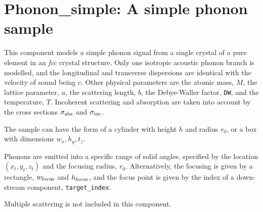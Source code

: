 \section{Phonon\_simple: A simple phonon sample}
\label{s:phonon_simple}


This component models a simple phonon signal from a single crystal of
a pure element in an {\em fcc} crystal structure.
Only one isotropic acoustic phonon branch is modelled, and the longitudinal
and transverse dispersions are identical with the velocity of sound being $c$.
Other physical parameters are the atomic mass, $M$, the lattice parameter, $a$,
the scattering length, $b$,
the Debye-Waller factor, \verb+DW+, and the temperature, $T$.
Incoherent scattering and absorption are taken into account by the cross
sections $\sigma_{\rm abs}$ and $\sigma_{\rm inc}$.

The sample can have the form of a cylinder with height $h$ and radius
$r_0$, or a box with dimensions $w_x, h_y, t_z$.

Phonons are emitted into a specific range of solid angles, specified
by the location $(x_t, y_t, z_t)$ and the focusing radius, $r_0$.
Alternatively, the focusing is given by a rectangle,
$w_{\rm focus}$ and $h_{\rm focus}$, and the focus point is given by the
index of a down-stream component, \verb+target_index+.

Multiple scattering is not included in this component.


